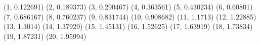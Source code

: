 (1, 0.122691) (2, 0.189373) (3, 0.290467) (4, 0.363561) (5, 0.430234) (6, 0.60801) (7, 0.686167) (8, 0.760237) (9, 0.831744) (10, 0.908682) (11, 1.1713) (12, 1.22885) (13, 1.3014) (14, 1.37929) (15, 1.45131) (16, 1.52625) (17, 1.63919) (18, 1.73834) (19, 1.87231) (20, 1.95994) 